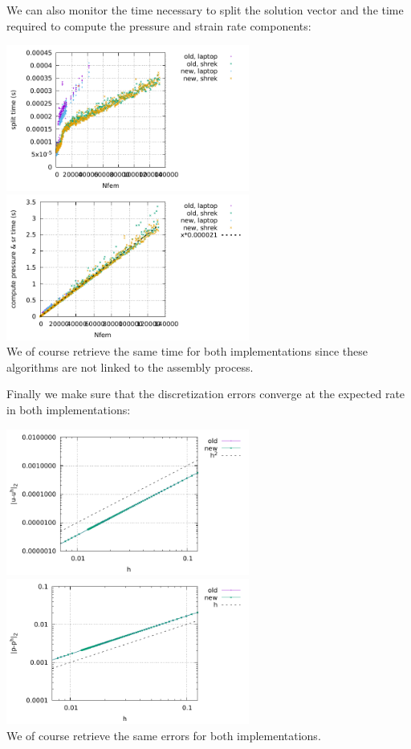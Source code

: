 We can also monitor the time necessary to split the solution vector
and the time required to compute the pressure and strain rate components:
\begin{center}
\includegraphics[width=8cm]{python_codes/fieldstone_176/results/split.pdf}
\includegraphics[width=8cm]{python_codes/fieldstone_176/results/compute_press_sr.pdf}\\
{\captionfont We of course retrieve the same time for both implementations since
these algorithms are not linked to the assembly process.}
\end{center}

Finally we make sure that the discretization errors converge at the expected rate
in both implementations:
\begin{center}
\includegraphics[width=8cm]{python_codes/fieldstone_176/results/errv.pdf}
\includegraphics[width=8cm]{python_codes/fieldstone_176/results/errp.pdf}\\
{\captionfont We of course retrieve the same errors for both implementations.}
\end{center}
